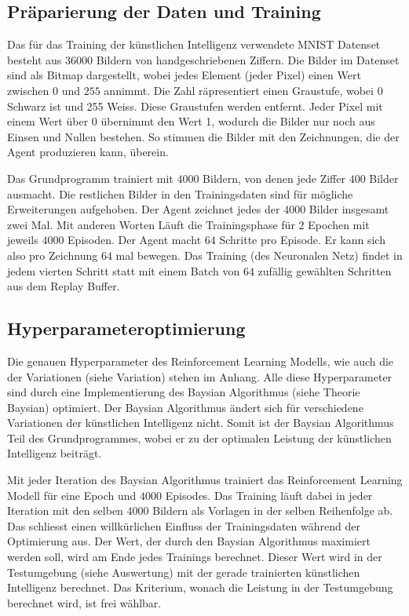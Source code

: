\subsection{Präparierung der Daten und Training}
Das für das Training der künstlichen Intelligenz verwendete MNIST Datenset
besteht aus $36000$ Bildern von handgeschriebenen Ziffern. Die Bilder im
Datenset sind als Bitmap dargestellt, wobei jedes Element (jeder Pixel) einen
Wert zwischen $0$ und $255$ annimmt. Die Zahl räpresentiert einen Graustufe,
wobei 0 Schwarz ist und 255 Weiss. Diese Graustufen werden entfernt. Jeder Pixel
mit einem Wert über 0 übernimmt den Wert 1, wodurch die Bilder nur noch aus
Einsen und Nullen bestehen. So stimmen die Bilder mit den Zeichnungen, die der
Agent produzieren kann, überein.

Das Grundprogramm trainiert mit $4000$ Bildern, von denen jede Ziffer $400$
Bilder ausmacht. Die restlichen Bilder in den Trainingsdaten sind für mögliche
Erweiterungen aufgehoben. Der Agent zeichnet jedes der $4000$ Bilder insgesamt
zwei Mal. Mit anderen Worten Läuft die Trainingsphase für $2$ Epochen mit
jeweils $4000$ Episoden. Der Agent macht $64$ Schritte pro Episode. Er kann sich
also pro Zeichnung $64$ mal bewegen. Das Training (des Neuronalen Netz) findet
in jedem vierten Schritt statt mit einem Batch von $64$ zufällig gewählten
Schritten aus dem Replay Buffer.

\subsection{Hyperparameteroptimierung}
\label{chap:Hyperparameter Optimierung}
Die genauen Hyperparameter des Reinforcement Learning Modells, wie auch die der     
Variationen (siehe Variation) stehen im Anhang. Alle diese Hyperparameter sind    %
durch eine Implementierung des Baysian Algorithmus \cite{fernando_bayesian_2022}
(siehe Theorie Baysian) optimiert. Der Baysian Algorithmus ändert sich für
verschiedene Variationen der künstlichen Intelligenz nicht. Somit ist der
Baysian Algorithmus Teil des Grundprogrammes, wobei er zu der optimalen Leistung
der künstlichen Intelligenz beiträgt. 

Mit jeder Iteration des Baysian Algorithmus trainiert das Reinforcement Learning
Modell für eine Epoch und $4000$ Episodes. Das Training läuft dabei in jeder
Iteration mit den selben $4000$ Bildern als Vorlagen in der selben Reihenfolge
ab. Das schliesst einen willkürlichen Einfluss der Trainingsdaten während der
Optimierung aus. Der Wert, der durch den Baysian Algorithmus maximiert werden
soll, wird am Ende jedes Trainings berechnet. Dieser Wert wird in der
Testumgebung (siehe Auswertung) mit der gerade trainierten künstlichen    %
Intelligenz berechnet. Das Kriterium, wonach die Leistung in der Testumgebung
berechnet wird, ist frei wählbar.


